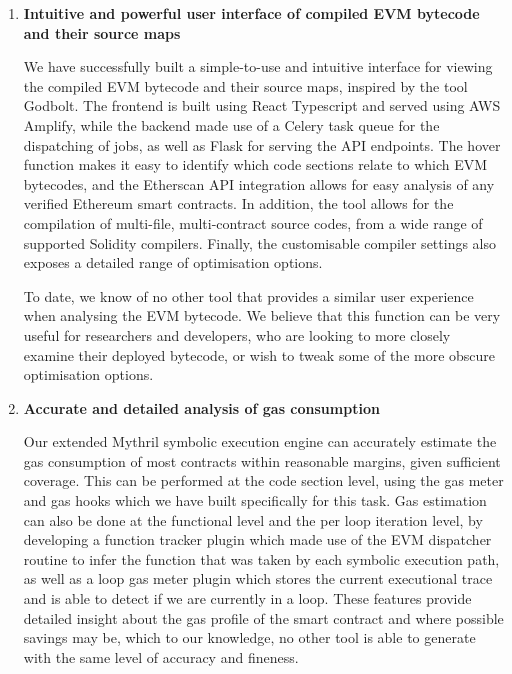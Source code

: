 \begin{enumerate}
  \item \textbf{Intuitive and powerful user interface of compiled EVM bytecode and their source maps}
  
    We have successfully built a simple-to-use and intuitive interface for
    viewing the compiled EVM bytecode and their source maps, inspired
    by the tool Godbolt. The frontend is built using React Typescript and served using
    AWS Amplify, while the backend made use of a Celery task queue for the dispatching of
    jobs, as well as Flask for serving the API endpoints. 
    The hover function makes it easy to identify which code
    sections relate to which EVM bytecodes, and the Etherscan API integration
    allows for easy analysis of any verified Ethereum smart contracts. 
    In addition, the tool allows for the compilation of multi-file, multi-contract
    source codes, from a wide range of supported Solidity compilers. 
    Finally, the customisable compiler settings also exposes a detailed
    range of optimisation options.

    To date,
    we know of no other tool that provides a similar user experience when
    analysing the EVM bytecode. We believe that this function can be very
    useful for researchers and developers, who are looking to more closely
    examine their deployed bytecode, or wish to tweak some of the more obscure
    optimisation options.
    
  \item \textbf{Accurate and detailed analysis of gas consumption}
  
    Our extended Mythril symbolic execution engine can accurately estimate the gas consumption of
    most contracts within reasonable margins, given sufficient coverage. This can be
    performed at the code section level, using the gas meter and gas hooks which we have 
    built specifically for this task. Gas estimation can also be done at the functional level
    and the per loop iteration level, by 
    developing a function tracker plugin which made use of the EVM dispatcher routine to
    infer the function that was taken by each symbolic execution path,
    as well as a loop gas meter plugin which stores the current executional trace
    and is able to detect if we are currently in a loop. These features provide detailed insight about the gas profile
    of the smart contract and where possible savings may be, which to our knowledge,
    no other tool is able to generate with the same level of accuracy and fineness.


\end{enumerate}
